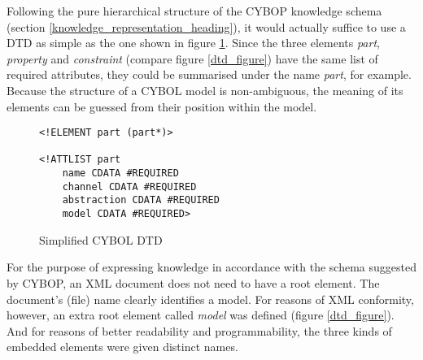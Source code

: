 Following the pure hierarchical structure of the CYBOP knowledge schema (section
\ref{knowledge_representation_heading}), it would actually suffice to use a DTD
as simple as the one shown in figure \ref{simpledtd_figure}. Since the three
elements \emph{part}, \emph{property} and \emph{constraint} (compare figure
\ref{dtd_figure}) have the same list of required attributes, they could be
summarised under the name \emph{part}, for example. Because the structure of a
CYBOL model is non-ambiguous, the meaning of its elements can be guessed from
their position within the model.

\begin{figure}[ht]
    \bigskip
    \begin{scriptsize}
        \begin{verbatim}
<!ELEMENT part (part*)>

<!ATTLIST part
    name CDATA #REQUIRED
    channel CDATA #REQUIRED
    abstraction CDATA #REQUIRED
    model CDATA #REQUIRED>
        \end{verbatim}
    \end{scriptsize}
    \caption{Simplified CYBOL DTD}
    \label{simpledtd_figure}
\end{figure}

For the purpose of expressing knowledge in accordance with the schema suggested
by CYBOP, an XML document does not need to have a root element. The document's
(file) name clearly identifies a model. For reasons of XML conformity, however,
an extra root element called \emph{model} was defined (figure \ref{dtd_figure}).
And for reasons of better readability and programmability, the three kinds of
embedded elements were given distinct names.
